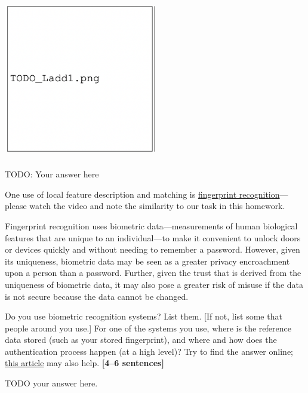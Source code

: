 \documentclass{csci1430}
\begin{document}
\begin{answer}
\includegraphics[width=0.5\textwidth,height=7cm,keepaspectratio]{images/TODO_Ladd1.png}

TODO: Your answer here
\end{answer}


\pagebreak

\begin{question}[points=9,orangebox=false] 
One use of local feature description and matching is \href{https://youtu.be/xD88Qs_DZp4?t=11}{fingerprint recognition}---please watch the video and note the similarity to our task in this homework. 

Fingerprint recognition uses biometric data---measurements of human biological features that are unique to an individual---to make it convenient to unlock doors or devices quickly and without needing to remember a password. However, given its uniqueness, biometric data may be seen as a greater privacy encroachment upon a person than a password. Further, given the trust that is derived from the uniqueness of biometric data, it may also pose a greater risk of misuse if the data is not secure because the data cannot be changed.
\end{question}

\begin{subquestion}[points=3]
Do you use biometric recognition systems? List them. [If not, list some that people around you use.]
For one of the systems you use, where is the reference data stored (such as your stored fingerprint), and where and how does the authentication process happen (at a high level)? 
Try to find the answer online; \href{https://ievoreader.com/how-biometric-data-is-stored/}{this article} may also help. \textbf{[4--6 sentences]}
\end{subquestion}
    
\begin{answer}
TODO your answer here.
\end{answer}
\end{document}
